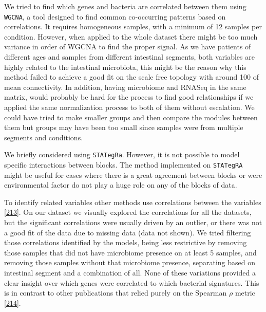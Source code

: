 \documentclass[
  12pt,
  a4paper,
  twoside,
  openright]{book}
\begin{document}
We tried to find which genes and bacteria are correlated between them using \texttt{WGCNA}, a tool designed to find common co-occurring patterns based on correlations.
It requires homogeneous samples, with a minimum of 12 samples per condition.
However, when applied to the whole dataset there might be too much variance in order of WGCNA to find the proper signal.
As we have patients of different ages and samples from different intestinal segments, both variables are highly related to the intestinal microbiota, this might be the reason why this method failed to achieve a good fit on the scale free topology with around 100 of mean connectivity.
In addition, having microbiome and RNASeq in the same matrix, would probably be hard for the process to find good relationships if we applied the same normalization process to both of them without escalation.
We could have tried to make smaller groups and then compare the modules between them but groups may have been too small since samples were from multiple segments and conditions.

We briefly considered using \texttt{STATegRa}.
However, it is not possible to model specific interactions between blocks.
The method implemented on \texttt{STATegRA} might be useful for cases where there is a great agreement between blocks or were environmental factor do not play a huge role on any of the blocks of data.

To identify related variables other methods use correlations between the variables {[}\protect\hyperlink{ref-vila-casadesuxfas2016}{213}{]}.
On our dataset we visually explored the correlations for all the datasets, but the significant correlations were usually driven by an outlier, or there was not a good fit of the data due to missing data (data not shown).
We tried filtering those correlations identified by the models, being less restrictive by removing those samples that did not have microbiome presence on at least 5 samples, and removing those samples without that microbiome presence, separating based on intestinal segment and a combination of all.
None of these variations provided a clear insight over which genes were correlated to which bacterial signatures.
This is in contrast to other publications that relied purely on the Spearman \(\rho\) metric {[}\protect\hyperlink{ref-huxe4sler2017}{214}{]}.
\end{document}
